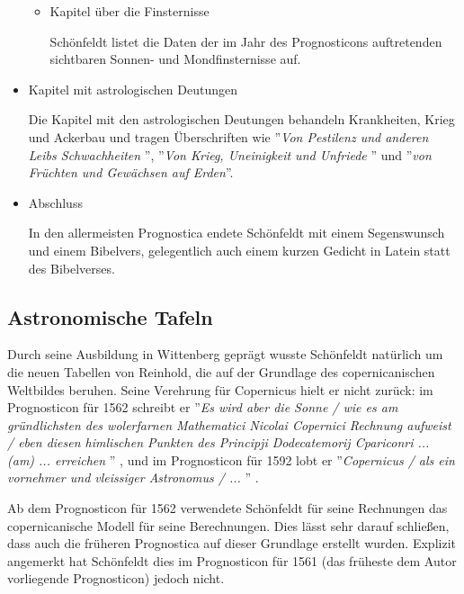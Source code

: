 \documentclass[12pt]{article}
\begin{document}
\begin{itemize}
\begin{itemize}
		\item Kapitel über die Finsternisse
		
		Schönfeldt listet die Daten der im Jahr des Prognosticons auftretenden sichtbaren Sonnen- und Mondfinsternisse auf.
		
		
	\end{itemize}
	
	\item Kapitel mit astrologischen Deutungen
	
	Die Kapitel mit den astrologischen Deutungen behandeln Krankheiten, Krieg und Ackerbau und tragen Überschriften wie ''\emph{Von Pestilenz und anderen Leibs Schwachheiten }'', ''\emph{Von Krieg, Uneinigkeit und Unfriede }'' und ''\emph{von Früchten und Gewächsen auf Erden}''.
	
	\item Abschluss
	
	In den allermeisten Prognostica endete Schönfeldt mit einem Segenswunsch und einem Bibelvers, gelegentlich auch einem kurzen Gedicht in Latein statt des Bibelverses.
	
	
\end{itemize}

\subsection{Astronomische Tafeln}
\label{sec_astronomische_tafeln}

Durch seine Ausbildung in Wittenberg geprägt wusste Schönfeldt natürlich um die neuen Tabellen von Reinhold, die auf der Grundlage des copernicanischen Weltbildes beruhen. Seine Verehrung für Copernicus hielt er nicht zurück: im Prognosticon für 1562 schreibt er ''\emph{Es wird aber die Sonne / wie es am gründlichsten des wolerfarnen Mathematici Nicolai Copernici Rechnung aufweist / eben diesen himlischen Punkten des Principji Dodecatemorij Cpariconri ... (am) ... erreichen }'' \cite{Schoenfeldt1561}, und im Prognosticon für 1592 lobt er ''\emph{Copernicus / als ein vornehmer und vleissiger Astronomus / ... }''
\cite{Schoenfeldt1591a}.

Ab dem Prognosticon für 1562 verwendete Schönfeldt für seine Rechnungen das copernicanische Modell für seine Berechnungen.
Dies lässt sehr darauf schließen, dass auch die früheren Prognostica auf dieser Grundlage erstellt wurden. Explizit angemerkt hat Schönfeldt dies im Prognosticon für 1561 (das früheste dem Autor vorliegende Prognosticon) jedoch nicht.
\end{document}
